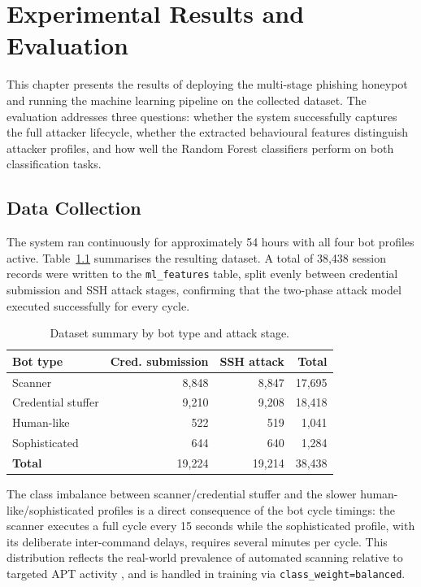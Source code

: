 
\chapter{Experimental Results and Evaluation}\label{chapter:chap4}

This chapter presents the results of deploying the multi-stage phishing
honeypot and running the machine learning pipeline on the collected dataset.
The evaluation addresses three questions: whether the system successfully
captures the full attacker lifecycle, whether the extracted behavioural
features distinguish attacker profiles, and how well the Random Forest
classifiers perform on both classification tasks.

\section{Data Collection}

The system ran continuously for approximately 54 hours with all four bot
profiles active. Table~\ref{tab:dataset_summary} summarises the resulting
dataset. A total of 38,438 session records were written to the
\texttt{ml\_features} table, split evenly between credential submission
and SSH attack stages, confirming that the two-phase attack model
executed successfully for every cycle.

\begin{table}[h]
\centering
\caption{Dataset summary by bot type and attack stage.}
\label{tab:dataset_summary}
\begin{tabular}{lrrr}
\hline
\textbf{Bot type} & \textbf{Cred. submission} & \textbf{SSH attack} & \textbf{Total} \\
\hline
Scanner            & 8,848 & 8,847 & 17,695 \\
Credential stuffer & 9,210 & 9,208 & 18,418 \\
Human-like         & 522   & 519   & 1,041  \\
Sophisticated      & 644   & 640   & 1,284  \\
\hline
\textbf{Total}     & 19,224 & 19,214 & 38,438 \\
\hline
\end{tabular}
\end{table}

The class imbalance between scanner/credential stuffer and the slower
human-like/sophisticated profiles is a direct consequence of the bot cycle
timings: the scanner executes a full cycle every 15 seconds while the
sophisticated profile, with its deliberate inter-command delays, requires
several minutes per cycle. This distribution reflects the real-world
prevalence of automated scanning relative to targeted APT activity
\cite{Bringer2012HoneypotSurvey}, and is handled in training via
\texttt{class\_weight=balanced}.

